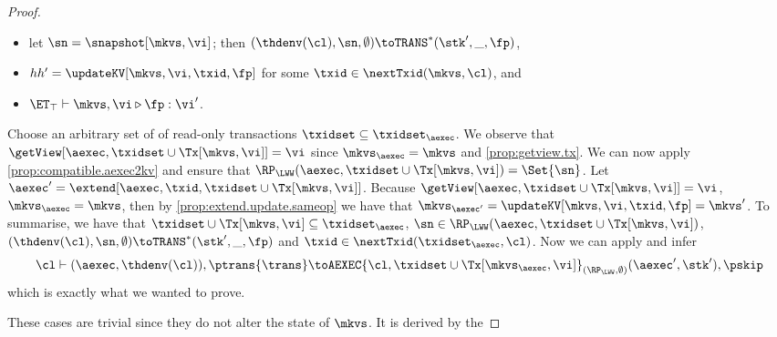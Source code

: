 \begin{proof}
\begin{itemize}
\item let $\sn = \snapshot[\mkvs, \vi]$; then $(\thdenv(\cl), \sn, \emptyset) \toTRANS^{\ast} (\stk', \_, \fp)$, 
\item $hh' = \updateKV[\mkvs, \vi, \txid, \fp]$ for some $\txid \in \nextTxid(\mkvs, \cl)$, and
\item $\ET_{\top} \vdash \mkvs, \vi \triangleright \fp: \vi'$.
\end{itemize}
Choose an arbitrary set of of read-only transactions $\txidset \subseteq \txidset_{\aexec}$.
We observe that $\getView[\aexec, \txidset \cup \Tx[\mkvs, \vi]] = \vi$ since $\mkvs_{\aexec} = \mkvs$ and \cref{prop:getview.tx}.
We can now apply \cref{prop:compatible.aexec2kv} and ensure that $\RP_{\LWW}(\aexec, \txidset \cup \Tx[\mkvs, \vi]) = \Set{\sn}$.
Let $\aexec' = \extend[\aexec, \txid, \txidset \cup \Tx[\mkvs, \vi]]$. 
Because $\getView[\aexec, \txidset \cup \Tx[\mkvs, \vi]] = \vi$, $\mkvs_{\aexec} = \mkvs$,
then by \cref{prop:extend.update.sameop} we have that $\mkvs_{\aexec'} = \updateKV[\mkvs, \vi, \txid, \fp] = \mkvs'$. 
To summarise, we have that $\txidset \cup \Tx[\mkvs, \vi] \subseteq \txidset_{\aexec}$, $\sn \in \RP_{\LWW}(\aexec, \txidset \cup \Tx[\mkvs, \vi])$,
$(\thdenv(\cl), \sn, \emptyset) \toTRANS^{\ast} (\stk', \_, \fp)$ and $\txid \in \nextTxid(\txidset_{\aexec}, \cl)$. 
Now we can apply  and infer
\[
\cl \vdash (\aexec, \thdenv(\cl)), \ptrans{\trans} \toAEXEC{\cl, \txidset \cup \Tx[\mkvs_{\aexec}, \vi]}_{(\RP_{\LWW}, \emptyset)} 
(\aexec', \stk'), \pskip
\]
which is exactly what we wanted to prove. 

These cases are trivial since they do not alter the state of \( \mkvs \).
It is derived by the \ih
\end{proof}

